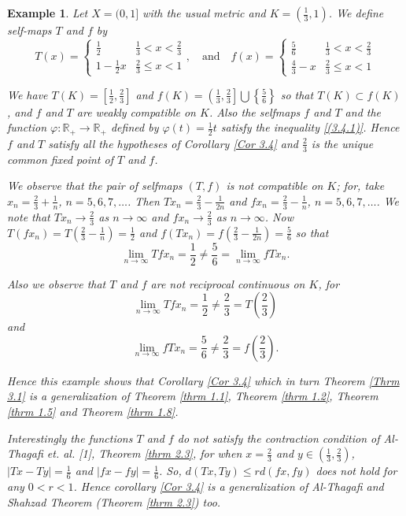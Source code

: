 \documentclass[a4paper,12pt,oneside]{article}
\newtheorem{example}[theorem]{Example}
\numberwithin{equation}{section}
\begin{document}
\begin{example} \label{Ex 3.4}
Let \(X = (0,1]\) with the usual metric and \(K = \left(\frac{1}{3}, 1\right)\). We define self-maps \(T\) and \(f\) by
\[
    T(x) = \begin{cases} 
        \frac{1}{2} & \frac{1}{3} < x < \frac{2}{3} \\
        1 - \frac{1}{2}x & \frac{2}{3} \leq x < 1 
    \end{cases}, \quad \text{and} \quad
    f(x) = \begin{cases} 
        \frac{5}{6} & \frac{1}{3} < x < \frac{2}{3} \\
        \frac{4}{3} - x & \frac{2}{3} \leq x < 1 
    \end{cases}
    \]

We have \(T(K)=\left[\frac{1}{2},\frac{2}{3}\right]\) and \(f(K)=\left(\frac{1}{3},\frac{2}{3}\right]\bigcup\left\{\frac{5}{6}\right\}\) so that \(T(K)\subset f(K)\), and \(f\) and \(T\) are weakly compatible on \(K\). Also the selfmaps \(f\) and \(T\) and the function \(\varphi:\mathbb{R}_{+}\to \mathbb{R}_{+}\) defined by \(\varphi(t)=\frac{1}{2}t\) satisfy the inequality \eqref{(3.4.1)}. Hence \(f\) and \(T\) satisfy all the hypotheses of Corollary \eqref{Cor 3.4} and \(\frac{2}{3}\) is the unique common fixed point of \(T\) and \(f\).

We observe that the pair of selfmaps \((T,f)\) is not compatible on \(K\); for, take \(x_{n}=\frac{2}{3}+\frac{1}{n}\), \(n=5,6,7,\ldots\). Then \(Tx_{n}=\frac{2}{3}-\frac{1}{2n}\) and \(fx_{n}=\frac{2}{3}-\frac{1}{n}\), \(n=5,6,7,\ldots\). We note that \(Tx_{n}\rightarrow\frac{2}{3}\) as \(n\rightarrow\infty\) and \(fx_{n}\rightarrow\frac{2}{3}\) as \(n\rightarrow\infty\). Now \(T(fx_{n})=T\left(\frac{2}{3}-\frac{1}{n}\right)=\frac{1}{2}\) and \(f(Tx_{n})=f\left(\frac{2}{3}-\frac{1}{2n}\right)=\frac{5}{6}\) so that 
\[
\lim\limits_{n\rightarrow\infty}Tfx_{n}=\frac{1}{2}\neq\frac{5}{6}=\lim\limits_{n\rightarrow\infty}fTx_{n}.
\]

Also we observe that \(T\) and \(f\) are not reciprocal continuous on \(K\), for 
\[
\lim\limits_{n\rightarrow\infty}Tfx_{n}=\frac{1}{2}\neq\frac{2}{3}=T\left(\frac{2}{3}\right)
\]
and 
\[
\lim\limits_{n\rightarrow\infty}fTx_{n}=\frac{5}{6}\neq\frac{2}{3}=f\left(\frac{2}{3}\right).
\]

Hence this example shows that Corollary \eqref{Cor 3.4} which in turn Theorem \eqref{Thrm 3.1} is a generalization of Theorem \eqref{thrm 1.1}, Theorem \eqref{thrm 1.2}, Theorem \eqref{thrm 1.5} and Theorem \eqref{thrm 1.8}.

Interestingly the functions \(T\) and \(f\) do not satisfy the contraction condition of Al-Thagafi \textit{et. al.} [1], Theorem \eqref{thrm 2.3}, for when \(x=\frac{2}{3}\) and \(y\in\left(\frac{1}{3},\frac{2}{3}\right)\), \(|Tx-Ty|=\frac{1}{6}\) and \(|fx-fy|=\frac{1}{6}\). So, \(d(Tx,Ty)\leq r d(fx,fy)\) does not hold for any \(0<r<1\). Hence corollary \eqref{Cor 3.4} is a generalization of Al-Thagafi and Shahzad Theorem (Theorem \eqref{thrm 2.3}) too.
\end{example}
\end{document}
